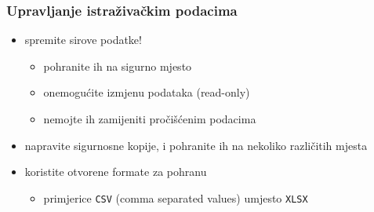 \documentclass[aspectratio=169]{beamer}
\newenvironment{noheadline}{
    \setbeamertemplate{headline}{}
}{}
\begin{document}
\begin{noheadline}
    \begin{frame}
        \frametitle{Upravljanje istraživačkim podacima}

        \begin{itemize}
            \setlength{\itemsep}{2em}

            \item spremite sirove podatke!

            \begin{itemize}
                \item pohranite ih na sigurno mjesto

                \item onemogućite izmjenu podataka (read-only)

                \item nemojte ih zamijeniti pročišćenim podacima

            \end{itemize}

            \pause

            \item napravite sigurnosne kopije, i pohranite ih na nekoliko
                različitih mjesta

            \pause

            \item koristite otvorene formate za pohranu

            \begin{itemize}
                \item primjerice \texttt{CSV} (comma separated values) umjesto
                    \texttt{XLSX}
            \end{itemize}
        \end{itemize}
    \end{frame}
\end{noheadline}
\end{document}
